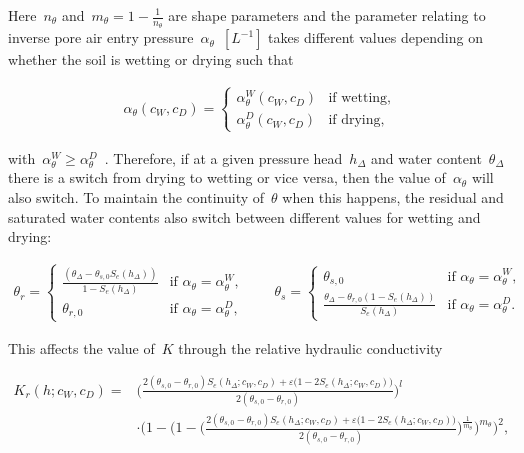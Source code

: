 \documentclass[11pt,a4paper]{article}
\numberwithin{equation}{section}
\begin{document}
Here~$n_\theta$ and~$m_\theta=1-\frac{1}{n_\theta}$ are shape parameters and the parameter relating to inverse pore air entry pressure~$\alpha_{\theta}$~$[L^{-1}]$ takes different values depending on whether the soil is wetting or drying such that
\begin{linenomath*}
	\begin{equation}\label{model: inverse air entry pressure head}
		\begin{aligned}
			\alpha_{\theta}(c_W, c_D) =
			\begin{cases}
				\alpha_\theta^W(c_W, c_D) &\text{if wetting,}\\
				\alpha_\theta^D(c_W, c_D) &\text{if drying,}
			\end{cases}
		\end{aligned}
	\end{equation}
\end{linenomath*}
with~$\alpha_\theta^W \geq \alpha_\theta^D$~\citep{kool1987development}. Therefore, if at a given pressure head~$h_\Delta$ and  water content~$\theta_\Delta$ there is a switch from drying to wetting or vice versa, then the value of~$\alpha_{\theta}$ will also switch. To maintain the continuity of~$\theta$ when this happens, the residual and saturated water contents also switch between different values for wetting and drying:
\begin{linenomath*}
	\begin{equation}\label{model: hysteretic residual and saturated}
		\begin{aligned}
			\theta_{r}= 
			\begin{cases}
				\frac{(\theta_\Delta - \theta_{s,0}S_e(h_\Delta))}{1- S_e(h_\Delta)} &\text{if }\alpha_\theta=\alpha_\theta^W,\\
				\theta_{r,0} &\text{if }\alpha_\theta=\alpha_\theta^D, 
			\end{cases}\qquad
			\theta_{s} =
			\begin{cases}
				\theta_{s,0} &\text{if }\alpha_\theta=\alpha_\theta^W,\\
				\frac{\theta_\Delta - \theta_{r,0}(1-S_e(h_\Delta))}{S_e(h_\Delta)}&\text{if }\alpha_\theta =\alpha_\theta^D.
			\end{cases}			
		\end{aligned}
	\end{equation}
\end{linenomath*}   
This affects the value 
of~$K$ through the relative hydraulic conductivity
\begin{linenomath*}
	\begin{equation}\label{model: relative conductivity}
		\begin{aligned}
			K_r(h; c_W, c_D)
			=&
			\Bigg(\frac{2(\theta_{s, 0} - \theta_{r,0})S_e(h_\Delta; c_W, c_D) + \varepsilon\big(1-2S_e(h_\Delta; c_W, c_D)\big)}{2(\theta_{s,0} - \theta_{r,0})}\Bigg)^l\\
			&\cdot
			\Bigg(1 - \Bigg(1 - \Bigg(\frac{2(\theta_{s,0} - \theta_{r,0})S_e(h_\Delta; c_W, c_D) + \varepsilon\big(1-2S_e(h_\Delta; c_W, c_D)\big)}{2(\theta_{s,0} - \theta_{r,0})}\Bigg)^\frac{1}{m_\theta}\Bigg)^{m_\theta}\Bigg)^2,
		\end{aligned}
	\end{equation}
\end{linenomath*}
\end{document}
